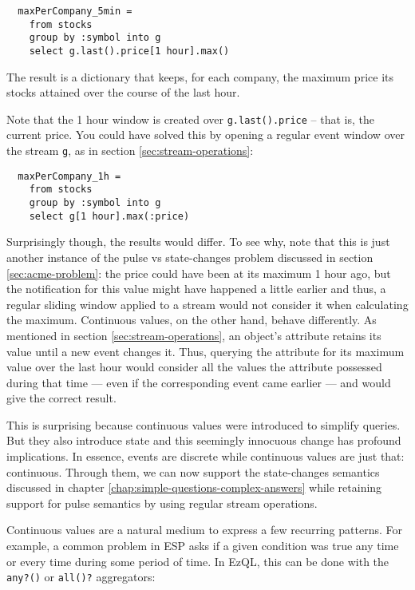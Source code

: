 \documentclass[a4,11pt]{report}
\begin{document}
\begin{lstlisting}
  maxPerCompany_5min =
    from stocks
    group by :symbol into g
    select g.last().price[1 hour].max()
\end{lstlisting}

The result is a dictionary that keeps, for each company, the maximum
price its stocks attained over the course of the last hour.

Note that the 1 hour window is created over \verb=g.last().price= --
that is, the current price. You could have solved this by opening a
regular event window over the stream \verb=g=, as in section
\ref{sec:stream-operations}:

\begin{lstlisting}
  maxPerCompany_1h =
    from stocks
    group by :symbol into g
    select g[1 hour].max(:price)
\end{lstlisting}

Surprisingly though, the results would differ. To see why, note that
this is just another instance of the pulse vs state-changes problem
discussed in section \ref{sec:acme-problem}: the price could have been
at its maximum 1 hour ago, but the notification for this value might
have happened a little earlier and thus, a regular sliding window
applied to a stream would not consider it when calculating the
maximum. Continuous values, on the other hand, behave differently. As
mentioned in section \ref{sec:stream-operations}, an object's
attribute retains its value until a new event changes it. Thus,
querying the attribute for its maximum value over the last hour would
consider all the values the attribute possessed during that time ---
even if the corresponding event came earlier --- and would give the
correct result.

This is surprising because continuous values were introduced to
simplify queries. But they also introduce state and this seemingly
innocuous change has profound implications. In essence, events are
discrete while continuous values are just that: continuous. Through
them, we can now support the state-changes semantics discussed in
chapter \ref{chap:simple-questions-complex-answers} while retaining
support for pulse semantics by using regular stream operations.

Continuous values are a natural medium to express a few recurring
patterns. For example, a common problem in ESP asks if a given
condition was true any time or every time during some period of
time. In EzQL, this can be done with the \verb=any?()= or
\verb=all()?= aggregators:
\end{document}
